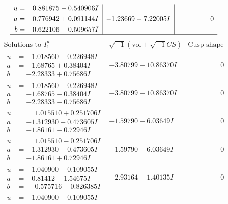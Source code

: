 \documentclass[1p]{elsarticle_modified}
\theoremstyle{definition}
\newcommand{\I}{\sqrt{-1}}
\begin{document}
$$\begin{array}{c|c|c}
\begin{aligned}
u &= \phantom{-}0.881875 - 0.540906 I \\
a &= \phantom{-}0.776942 + 0.091144 I \\
b &= -0.622106 - 0.509657 I\end{aligned}
 & -1.23669 + 7.22005 I & \phantom{-0.000000 } 0\\
 \hline 
 \end{array}$$\newpage$$\begin{array}{c|c|c}  
\text{Solutions to }I^u_{1}& \I (\text{vol} + \sqrt{-1}CS) & \text{Cusp shape}\\
 \hline 
\begin{aligned}
u &= -1.018560 + 0.226948 I \\
a &= -1.68765 + 0.38404 I \\
b &= -2.28333 + 0.75686 I\end{aligned}
 & -3.80799 + 10.86370 I & \phantom{-0.000000 } 0 \\ \hline\begin{aligned}
u &= -1.018560 - 0.226948 I \\
a &= -1.68765 - 0.38404 I \\
b &= -2.28333 - 0.75686 I\end{aligned}
 & -3.80799 - 10.86370 I & \phantom{-0.000000 } 0 \\ \hline\begin{aligned}
u &= \phantom{-}1.015510 + 0.251706 I \\
a &= -1.312930 - 0.473605 I \\
b &= -1.86161 - 0.72946 I\end{aligned}
 & -1.59790 - 6.03649 I & \phantom{-0.000000 } 0 \\ \hline\begin{aligned}
u &= \phantom{-}1.015510 - 0.251706 I \\
a &= -1.312930 + 0.473605 I \\
b &= -1.86161 + 0.72946 I\end{aligned}
 & -1.59790 + 6.03649 I & \phantom{-0.000000 } 0 \\ \hline\begin{aligned}
u &= -1.040900 + 0.109055 I \\
a &= -0.81412 - 1.54675 I \\
b &= \phantom{-}0.575716 - 0.826385 I\end{aligned}
 & -2.93164 + 1.40135 I & \phantom{-0.000000 } 0 \\ \hline\begin{aligned}
u &= -1.040900 - 0.109055 I \\

\end{aligned}
\end{array}$$
\end{document}
